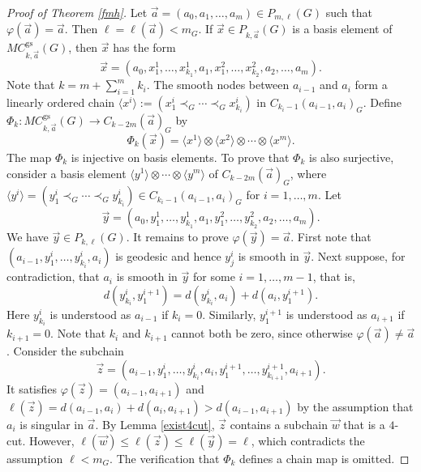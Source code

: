 \documentclass{amsart}
\numberwithin{equation}{section}
\theoremstyle{plain}
\theoremstyle{remark}
\theoremstyle{definition}
\numberwithin{equation}{section}
\newcommand{\gs}{\mathrm{gs}}
\begin{document}
\begin{proof}[Proof of Theorem \ref{fmh}]
    Let $\Vec{a}=(a_0,a_1,\ldots,a_m)\in P_{m,\ell}(G)$ such that $\varphi(\Vec{a})=\Vec{a}$. Then $\ell=\ell(\Vec{a})<m_G$. If $\Vec{x}\in P_{k,\Vec{a}}(G)$ is a basis element of $MC^{\gs}_{k,\Vec{a}}(G)$, then $\Vec{x}$ has the form
    \[
    \Vec{x}=(a_0,x^1_{1},\ldots,x^1_{k_1},a_1,x^2_{1},\ldots,x^2_{k_2},a_2,\ldots,a_m).
    \]
    Note that $k=m+\sum_{i=1}^m k_i$. The smooth nodes between $a_{i-1}$ and $a_i$ form a linearly ordered chain $\langle x^i\rangle:=(x^i_1\prec_G\cdots\prec_G x^i_{k_i})$ in $C_{k_i-1}(a_{i-1},a_i)_G$. Define $\Phi_k:MC^{\gs}_{k,\Vec{a}}(G)\to C_{k-2m}(\Vec{a})_G$ by 
    \[
    \Phi_k(\Vec{x})=\langle x^1\rangle\otimes\langle x^2\rangle\otimes\cdots\otimes\langle x^m\rangle.
    \]
    The map $\Phi_k$ is injective on basis elements. To prove that $\Phi_k$ is also surjective, consider a basis element $\langle y^1\rangle\otimes\cdots\otimes\langle y^m\rangle$ of $C_{k-2m}(\Vec{a})_G$, where $\langle y^i\rangle=(y^i_1\prec_G\cdots\prec_G y^i_{k_i})\in C_{k_i-1}(a_{i-1},a_i)_G$ for $i=1,\ldots,m$. Let
    \[
        \Vec{y}=(a_0,y^1_{1},\ldots,y^1_{k_1},a_1,y^2_{1},\ldots,y^2_{k_2},a_2,\ldots,a_m).
    \]
    We have $\Vec{y}\in P_{k,\ell}(G)$. It remains to prove $\varphi(\Vec{y})=\Vec{a}$. First note that $(a_{i-1},y^i_1,\ldots,y^i_{k_i},a_i)$ is geodesic and hence $y^i_{j}$ is smooth in $\Vec{y}$. Next suppose, for contradiction, that $a_i$ is smooth in $\Vec{y}$ for some $i=1,\ldots,m-1$, that is,
    \[
    d(y^i_{k_i},y^{i+1}_1)=d(y^i_{k_i},a_i)+d(a_i,y^{i+1}_1).
    \]
    Here $y^i_{k_i}$ is understood as $a_{i-1}$ if $k_i=0$. Similarly, $y^{i+1}_1$ is understood as $a_{i+1}$ if $k_{i+1}=0$. Note that $k_i$ and $k_{i+1}$ cannot both be zero, since otherwise $\varphi(\Vec{a})\neq\Vec{a}$. Consider the subchain
    \[
    \Vec{z}=(a_{i-1},y^i_1,\ldots,y^i_{k_i},a_i,y^{i+1}_1,\ldots,y^{i+1}_{k_{i+1}},a_{i+1}).
    \]
    It satisfies $\varphi(\Vec{z})=(a_{i-1},a_{i+1})$ and $\ell(\Vec{z})=d(a_{i-1},a_i)+d(a_i,a_{i+1})>d(a_{i-1},a_{i+1})$ by the assumption that $a_i$ is singular in $\Vec{a}$. By Lemma \ref{exist4cut}, $\Vec{z}$ contains a subchain $\Vec{w}$ that is a $4$-cut. However, $\ell(\Vec{w})\leq \ell(\Vec{z})\leq \ell(\Vec{y})=\ell$, which contradicts the assumption $\ell<m_G$. The verification that $\Phi_k$ defines a chain map is omitted.
\end{proof}
\end{document}
